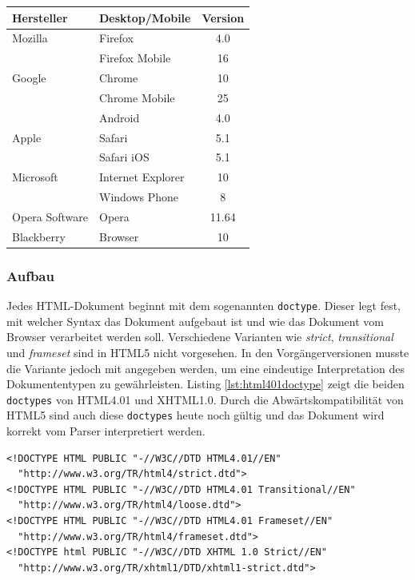 \vspace{1em}
\begin{center}
  \begin{tabular}{ | l | l | c | }
  \hline
  \textbf{Hersteller} & \textbf{Desktop/Mobile} & \textbf{Version} \\ \hline \hline
  Mozilla & Firefox & 4.0\\
	\hline
	& Firefox Mobile & 16\\
	\hline
	Google & Chrome & 10\\
	\hline
	& Chrome Mobile & 25\\
	\hline
	& Android & 4.0\\
	\hline
	Apple & Safari & 5.1\\
	\hline
	& Safari iOS & 5.1\\
	\hline
	Microsoft & Internet Explorer & 10\\
	\hline
	& Windows Phone & 8\\
	\hline
	Opera Software & Opera & 11.64\\
	\hline
	Blackberry & Browser & 10\\
  \hline
  \end{tabular}
\label{tab:html5browserkomp}
\end{center}

\subsubsection{Aufbau} Jedes HTML-Dokument beginnt mit dem sogenannten \texttt{doctype}. Dieser legt fest, mit welcher Syntax das Dokument aufgebaut ist und wie das Dokument vom Browser verarbeitet werden soll. Verschiedene Varianten wie \textit{strict}, \textit{transitional} und \textit{frameset} sind in HTML5 nicht vorgesehen. In den Vorgängerversionen musste die Variante jedoch mit angegeben werden, um eine eindeutige Interpretation des Dokumententypen zu gewährleisten. Listing \ref{lst:html401doctype} zeigt die beiden \texttt{doctypes} von HTML4.01 und XHTML1.0. Durch die Abwärtskompatibilität von HTML5 sind auch diese \texttt{doctypes} heute noch gültig und das Dokument wird korrekt vom Parser interpretiert werden.

\vspace{1em}
\begin{lstlisting}[language=HTML5, caption=(X)HTML4.01 \texttt{doctype}-Element, label=lst:html401doctype]
<!DOCTYPE HTML PUBLIC "-//W3C//DTD HTML4.01//EN"
  "http://www.w3.org/TR/html4/strict.dtd">
<!DOCTYPE HTML PUBLIC "-//W3C//DTD HTML4.01 Transitional//EN"
  "http://www.w3.org/TR/html4/loose.dtd">
<!DOCTYPE HTML PUBLIC "-//W3C//DTD HTML4.01 Frameset//EN"
  "http://www.w3.org/TR/html4/frameset.dtd">
<!DOCTYPE html PUBLIC "-//W3C//DTD XHTML 1.0 Strict//EN"
  "http://www.w3.org/TR/xhtml1/DTD/xhtml1-strict.dtd">
\end{lstlisting}
	
